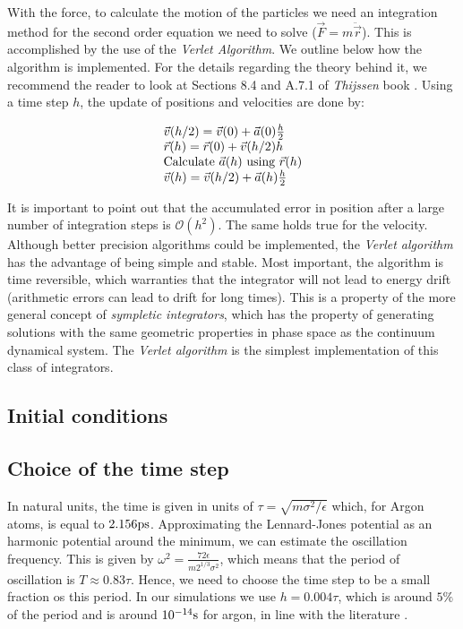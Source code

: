 \documentclass[aps,prl,reprint,groupedaddress]{revtex4-1}
\begin{document}
With the force, to calculate the motion of the particles we need an integration method for the second order equation we need to solve ($\vec{F} = m\ddot{\vec{r}}$). This is accomplished by the use of the \textit{Verlet Algorithm}. We outline below how the algorithm is implemented. For the details regarding the theory behind it, we recommend the reader to look at Sections 8.4 and A.7.1 of \textit{Thijssen} book \cite{ICCPBook}. Using a time step $h$, the update of positions and velocities are done by:

\begin{equation}
\begin{array}{l l}

\vec{v}(h/2) = \vec{v}(0) + \vec{a}(0)\frac{h}{2} \\
\vec{r}(h) = \vec{r}(0) + \vec{v}(h/2)h \\
\text{Calculate $\vec{a}(h)$ using $\vec{r}(h)$} \\
\vec{v}(h) = \vec{v}(h/2) + \vec{a}(h)\frac{h}{2}

\end{array}
\end{equation}

It is important to point out that the accumulated error in position after a large number of integration steps is $\mathcal{O}(h^2)$. The same holds true for the velocity. Although better precision algorithms could be implemented, the \textit{Verlet algorithm} has the advantage of being simple and stable. Most important, the algorithm is time reversible, which warranties that the integrator will not lead to energy drift (arithmetic errors can lead to drift for long times). This is a property of the more general concept of \textit{sympletic integrators}, which has the property of generating solutions with the same geometric properties in phase space as the continuum dynamical system. The \textit{Verlet algorithm} is the simplest implementation of this class of integrators.

\subsection{Initial conditions}

\subsection{Choice of the time step}

In natural units, the time is given in units of $\tau = \sqrt{m \sigma^2/\epsilon}$ which, for Argon atoms, is equal to $2.156 \textup{ps}$. Approximating the Lennard-Jones potential as an harmonic potential around the minimum, we can estimate the oscillation frequency. This is given by $\omega^2 = \frac{72 \epsilon}{m 2^{1/3} \sigma^2}$, which means that the period of oscillation is $T \approx 0.83 \tau$. Hence, we need to choose the time step to be a small fraction os this period. In our simulations we use $h = 0.004 \tau$, which is around $5 \%$ of the period and is around $10^{-14} \textup{s}$ for argon, in line with the literature \cite{Rahman1964}.  
\end{document}
